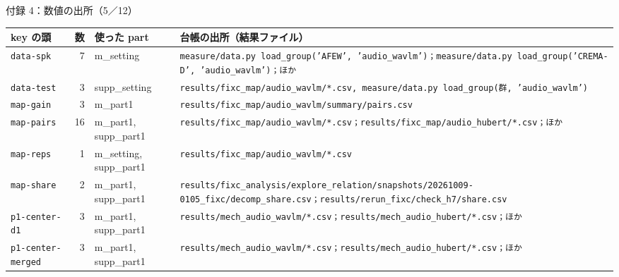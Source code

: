 \begin{frame}{付録 4：数値の出所（5／12）}
  \vspace{-0.3em}\centering\tiny\renewcommand{\arraystretch}{1.0}
  \begin{tabularx}{\textwidth}{@{}l r l X@{}}
    \toprule key の頭 & 数 & 使った part & 台帳の出所（結果ファイル） \\ \midrule
    \texttt{data-spk} & 7 & m\_setting & \texttt{measure/\allowbreak{}data.py load\_\allowbreak{}group('AFEW', 'audio\_\allowbreak{}wavlm')；measure/\allowbreak{}data.py load\_\allowbreak{}group('CREMA-D', 'audio\_\allowbreak{}wavlm')；ほか} \\
    \texttt{data-test} & 3 & supp\_setting & \texttt{results/\allowbreak{}fixc\_\allowbreak{}map/\allowbreak{}audio\_\allowbreak{}wavlm/\allowbreak{}*.csv, measure/\allowbreak{}data.py load\_\allowbreak{}group(群, 'audio\_\allowbreak{}wavlm')} \\
    \texttt{map-gain} & 3 & m\_part1 & \texttt{results/\allowbreak{}fixc\_\allowbreak{}map/\allowbreak{}audio\_\allowbreak{}wavlm/\allowbreak{}summary/\allowbreak{}pairs.csv} \\
    \texttt{map-pairs} & 16 & m\_part1, supp\_part1 & \texttt{results/\allowbreak{}fixc\_\allowbreak{}map/\allowbreak{}audio\_\allowbreak{}wavlm/\allowbreak{}*.csv；results/\allowbreak{}fixc\_\allowbreak{}map/\allowbreak{}audio\_\allowbreak{}hubert/\allowbreak{}*.csv；ほか} \\
    \texttt{map-reps} & 1 & m\_setting, supp\_part1 & \texttt{results/\allowbreak{}fixc\_\allowbreak{}map/\allowbreak{}audio\_\allowbreak{}wavlm/\allowbreak{}*.csv} \\
    \texttt{map-share} & 2 & m\_part1, supp\_part1 & \texttt{results/\allowbreak{}fixc\_\allowbreak{}analysis/\allowbreak{}explore\_\allowbreak{}relation/\allowbreak{}snapshots/\allowbreak{}20261009-0105\_\allowbreak{}fixc/\allowbreak{}decomp\_\allowbreak{}share.csv；results/\allowbreak{}rerun\_\allowbreak{}fixc/\allowbreak{}check\_\allowbreak{}h7/\allowbreak{}share.csv} \\
    \texttt{p1-center-d1} & 3 & m\_part1, supp\_part1 & \texttt{results/\allowbreak{}mech\_\allowbreak{}audio\_\allowbreak{}wavlm/\allowbreak{}*.csv；results/\allowbreak{}mech\_\allowbreak{}audio\_\allowbreak{}hubert/\allowbreak{}*.csv；ほか} \\
    \texttt{p1-center-merged} & 3 & m\_part1, supp\_part1 & \texttt{results/\allowbreak{}mech\_\allowbreak{}audio\_\allowbreak{}wavlm/\allowbreak{}*.csv；results/\allowbreak{}mech\_\allowbreak{}audio\_\allowbreak{}hubert/\allowbreak{}*.csv；ほか} \\

\end{tabularx}
\end{frame}
